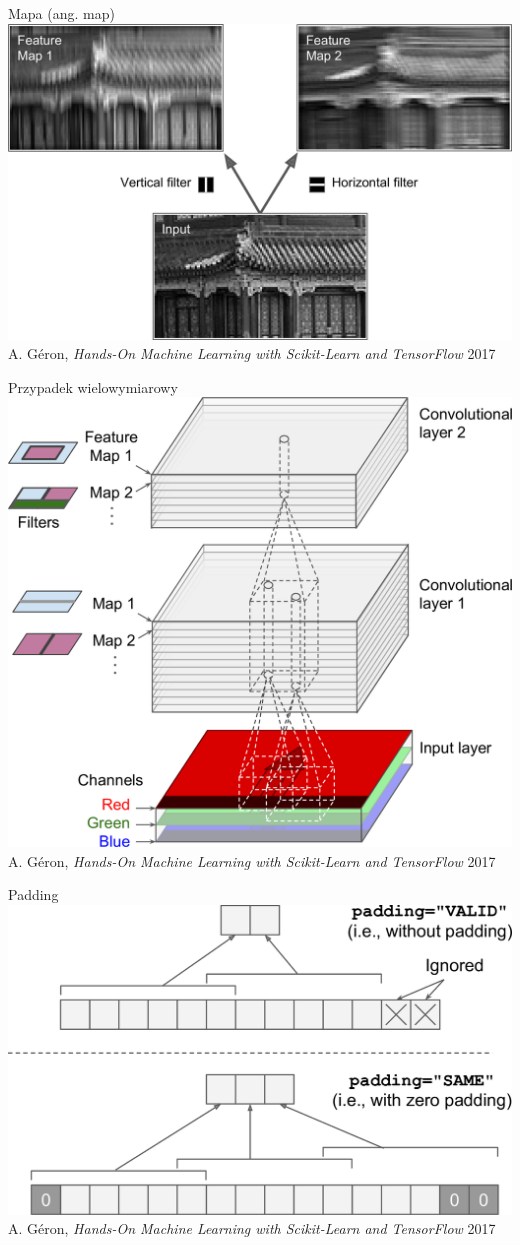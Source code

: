 \documentclass{sa}
\begin{document}
\begin{frame}{Mapa (ang. map)}
\includegraphics[width=\textwidth]{mlst_1305.png}
{\vfill\footnotesize A. Géron, \emph{Hands-On Machine Learning with Scikit-Learn and TensorFlow} 2017}
\end{frame}

\begin{frame}{Przypadek wielowymiarowy}
\centering
\includegraphics[width=.65\textwidth]{mlst_1306.png}
{\vfill\footnotesize A. Géron, \emph{Hands-On Machine Learning with Scikit-Learn and TensorFlow} 2017}
\end{frame}

\begin{frame}{Padding}
\includegraphics[width=\textwidth]{mlst_1307.png}
{\vfill\footnotesize A. Géron, \emph{Hands-On Machine Learning with Scikit-Learn and TensorFlow} 2017}
\end{frame}
\end{document}
